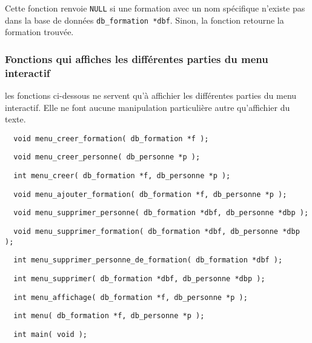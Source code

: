 \documentclass[10pt]{article}
\begin{document}
Cette fonction renvoie \texttt{NULL} si une formation avec un nom spécifique n'existe pas dans la base de données \texttt{db\_formation *dbf}. Sinon, la fonction retourne la formation trouvée.

\subsubsection{Fonctions qui affiches les différentes parties du menu interactif}
les fonctions ci-dessous ne servent qu'à affichier les différentes parties du menu interactif. Elle ne font aucune manipulation particulière autre qu'affichier du texte.
\begin{lstlisting}
  void menu_creer_formation( db_formation *f );
\end{lstlisting}

\begin{lstlisting}
  void menu_creer_personne( db_personne *p );
\end{lstlisting}

\begin{lstlisting}
  int menu_creer( db_formation *f, db_personne *p );
\end{lstlisting}

\begin{lstlisting}
  void menu_ajouter_formation( db_formation *f, db_personne *p );
\end{lstlisting}

\begin{lstlisting}
  void menu_supprimer_personne( db_formation *dbf, db_personne *dbp );
\end{lstlisting}

\begin{lstlisting}
  void menu_supprimer_formation( db_formation *dbf, db_personne *dbp );
\end{lstlisting}

\begin{lstlisting}
  int menu_supprimer_personne_de_formation( db_formation *dbf );
\end{lstlisting}

\begin{lstlisting}
  int menu_supprimer( db_formation *dbf, db_personne *dbp );
\end{lstlisting}

\begin{lstlisting}
  int menu_affichage( db_formation *f, db_personne *p );
\end{lstlisting}

\begin{lstlisting}
  int menu( db_formation *f, db_personne *p );
\end{lstlisting}

\begin{lstlisting}
  int main( void );
\end{lstlisting}

\newpage
\printglossary
\end{document}
